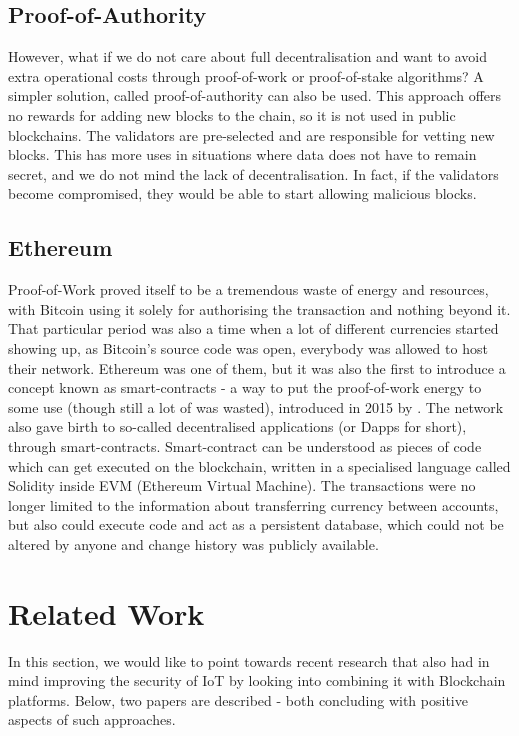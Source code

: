 \subsection{Proof-of-Authority}\label{sec:poa}
However, what if we do not care about full decentralisation and want to avoid extra operational costs through proof-of-work or proof-of-stake algorithms? A simpler solution, called proof-of-authority \cite{network2017proof} can also be used. This approach offers no rewards for adding new blocks to the chain, so it is not used in public blockchains. The validators are pre-selected and are responsible for vetting new blocks. This has more uses in situations where data does not have to remain secret, and we do not mind the lack of decentralisation. In fact, if the validators become compromised, they would be able to start allowing malicious blocks.
\subsection{Ethereum}
Proof-of-Work proved itself to be a tremendous waste of energy and resources, with Bitcoin using it solely for authorising the transaction and nothing beyond it. That particular period was also a time when a lot of different currencies started showing up, as Bitcoin's source code was open, everybody was allowed to host their network. Ethereum was one of them, but it was also the first to introduce a concept known as smart-contracts - a way to put the proof-of-work energy to some use (though still a lot of was wasted), introduced in 2015 by \citet{buterin2014ethereum}. The network also gave birth to so-called decentralised applications (or Dapps for short), through smart-contracts. Smart-contract can be understood as pieces of code which can get executed on the blockchain, written in a specialised language called Solidity inside EVM (Ethereum Virtual Machine). The transactions were no longer limited to the information about transferring currency between accounts, but also could execute code and act as a persistent database, which could not be altered by anyone and change history was publicly available.


\section{Related Work}
In this section, we would like to point towards recent research that also had in mind improving the security of IoT by looking into combining it with Blockchain platforms. Below, two papers are described - both concluding with positive aspects of such approaches.

